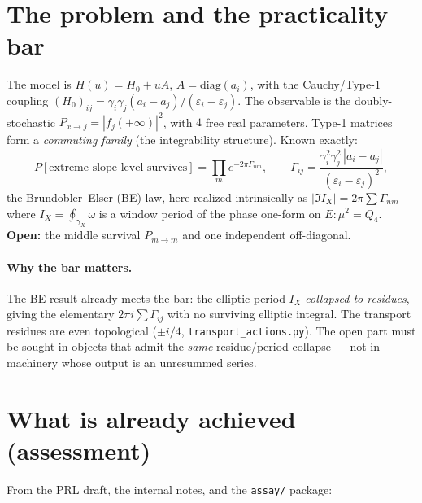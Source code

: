 \documentclass[11pt]{article}
\newcommand{\Gam}{\Gamma}
\newcommand{\eps}{\varepsilon}
\newcommand{\Pmid}{P_{m\to m}}
\begin{document}
\section{The problem and the practicality bar}
The model is $H(u)=H_0+uA$, $A=\mathrm{diag}(a_i)$, with the Cauchy/Type-1 coupling
$(H_0)_{ij}=\gamma_i\gamma_j(a_i-a_j)/(\eps_i-\eps_j)$. The observable is the doubly-stochastic
$P_{x\to j}=|f_j(+\infty)|^2$, with $4$ free real parameters. Type-1 matrices form a
\emph{commuting family} (the integrability structure). Known exactly:
\begin{equation}
P[\text{extreme-slope level survives}]=\prod_m e^{-2\pi\Gam_{nm}},\qquad
\Gam_{ij}=\frac{\gamma_i^2\gamma_j^2\,|a_i-a_j|}{(\eps_i-\eps_j)^2},
\label{eq:BE}
\end{equation}
the Brundobler--Elser (BE) law, here realized intrinsically as $|\!\Im I_X|=2\pi\sum\Gam_{nm}$
where $I_X=\oint_{\gamma_X}\omega$ is a window period of the phase one-form on
$E:\mu^2=Q_4$. \textbf{Open:} the middle survival $\Pmid$ and one independent off-diagonal.

\paragraph{Why the bar matters.} The BE result already meets the bar: the elliptic period $I_X$
\emph{collapsed to residues}, giving the elementary $2\pi i\sum\Gam_{ij}$ with no surviving
elliptic integral. The transport residues are even topological ($\pm i/4$, \texttt{transport\_actions.py}).
The open part must be sought in objects that admit the \emph{same} residue/period collapse ---
not in machinery whose output is an unresummed series.

\section{What is already achieved (assessment)}
From the PRL draft, the internal notes, and the \texttt{assay/} package:
\end{document}
